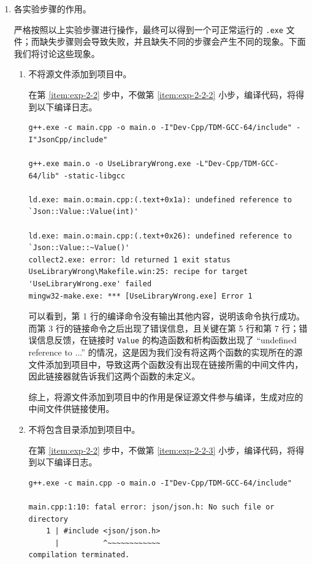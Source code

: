 \begin{enumerate}
	\item 各实验步骤的作用。

	严格按照以上实验步骤进行操作，最终可以得到一个可正常运行的 \lstinline[language={}]{.exe} 文件；而缺失步骤则会导致失败，并且缺失不同的步骤会产生不同的现象。下面我们将讨论这些现象。

	\begin{enumerate}
		\item 不将源文件添加到项目中。

		在第 \ref{item:exp-2-2} 步中，不做第 \ref{item:exp-2-2-2} 小步，编译代码，将得到以下编译日志。

		\begin{lstlisting}[language={}]
g++.exe -c main.cpp -o main.o -I"Dev-Cpp/TDM-GCC-64/include" -I"JsonCpp/include"

g++.exe main.o -o UseLibraryWrong.exe -L"Dev-Cpp/TDM-GCC-64/lib" -static-libgcc

ld.exe: main.o:main.cpp:(.text+0x1a): undefined reference to `Json::Value::Value(int)'

ld.exe: main.o:main.cpp:(.text+0x26): undefined reference to `Json::Value::~Value()'
collect2.exe: error: ld returned 1 exit status
UseLibraryWrong\Makefile.win:25: recipe for target 'UseLibraryWrong.exe' failed
mingw32-make.exe: *** [UseLibraryWrong.exe] Error 1
		\end{lstlisting}

		可以看到，第 1 行的编译命令没有输出其他内容，说明该命令执行成功。而第 3 行的链接命令之后出现了错误信息，且关键在第 5 行和第 7 行；错误信息反馈，在链接时 \lstinline[language={[17]C++}, moreemph={[1]Value}]{Value} 的构造函数和析构函数出现了 “undefined reference to ...” 的情况，这是因为我们没有将这两个函数的实现所在的源文件添加到项目中，导致这两个函数没有出现在链接所需的中间文件内，因此链接器就告诉我们这两个函数的未定义。

		综上，将源文件添加到项目中的作用是保证源文件参与编译，生成对应的中间文件供链接使用。

		\item 不将包含目录添加到项目中。

		在第 \ref{item:exp-2-2} 步中，不做第 \ref{item:exp-2-2-3} 小步，编译代码，将得到以下编译日志。

		\begin{lstlisting}[language={}]
g++.exe -c main.cpp -o main.o -I"Dev-Cpp/TDM-GCC-64/include"

main.cpp:1:10: fatal error: json/json.h: No such file or directory
    1 | #include <json/json.h>
      |          ^~~~~~~~~~~~~
compilation terminated.


\end{lstlisting}
\end{enumerate}
\end{enumerate}
